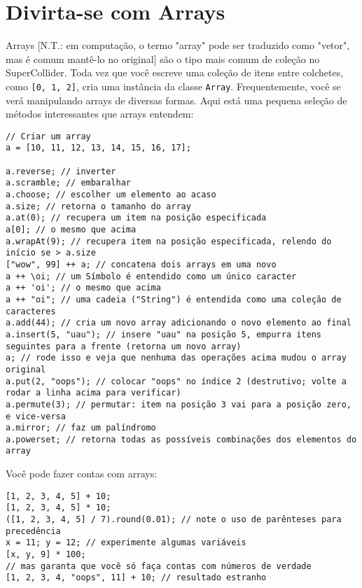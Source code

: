 \section{Divirta-se com Arrays}
\label{sec:arrays}

Arrays [N.T.: em computação, o termo "array" pode ser traduzido como "vetor", mas é comum mantê-lo no original] são o tipo mais comum de coleção no SuperCollider. Toda vez que você escreve uma coleção de itens entre colchetes, como \texttt{[0, 1, 2]}, cria uma instância da classe \texttt{Array}. Frequentemente, você se verá manipulando arrays de diversas formas. Aqui está uma pequena seleção de métodos interessantes que arrays entendem:

 
\begin{lstlisting}[style=SuperCollider-IDE, basicstyle=\scttfamily\footnotesize]
// Criar um array
a = [10, 11, 12, 13, 14, 15, 16, 17];

a.reverse; // inverter
a.scramble; // embaralhar
a.choose; // escolher um elemento ao acaso
a.size; // retorna o tamanho do array
a.at(0); // recupera um item na posição especificada
a[0]; // o mesmo que acima
a.wrapAt(9); // recupera item na posição especificada, relendo do início se > a.size
["wow", 99] ++ a; // concatena dois arrays em uma novo
a ++ \oi; // um Símbolo é entendido como um único caracter
a ++ 'oi'; // o mesmo que acima
a ++ "oi"; // uma cadeia ("String") é entendida como uma coleção de caracteres
a.add(44); // cria um novo array adicionando o novo elemento ao final
a.insert(5, "uau"); // insere "uau" na posição 5, empurra itens seguintes para a frente (retorna um novo array)
a; // rode isso e veja que nenhuma das operações acima mudou o array original
a.put(2, "oops"); // colocar "oops" no índice 2 (destrutivo; volte a rodar a linha acima para verificar)
a.permute(3); // permutar: item na posição 3 vai para a posição zero, e vice-versa
a.mirror; // faz um palíndromo
a.powerset; // retorna todas as possíveis combinações dos elementos do array
\end{lstlisting}
 

Você pode fazer contas com arrays:

 
\begin{lstlisting}[style=SuperCollider-IDE, basicstyle=\scttfamily\footnotesize]
[1, 2, 3, 4, 5] + 10;
[1, 2, 3, 4, 5] * 10;
([1, 2, 3, 4, 5] / 7).round(0.01); // note o uso de parênteses para precedência
x = 11; y = 12; // experimente algumas variáveis
[x, y, 9] * 100;
// mas garanta que você só faça contas com números de verdade
[1, 2, 3, 4, "oops", 11] + 10; // resultado estranho
\end{lstlisting}
 


